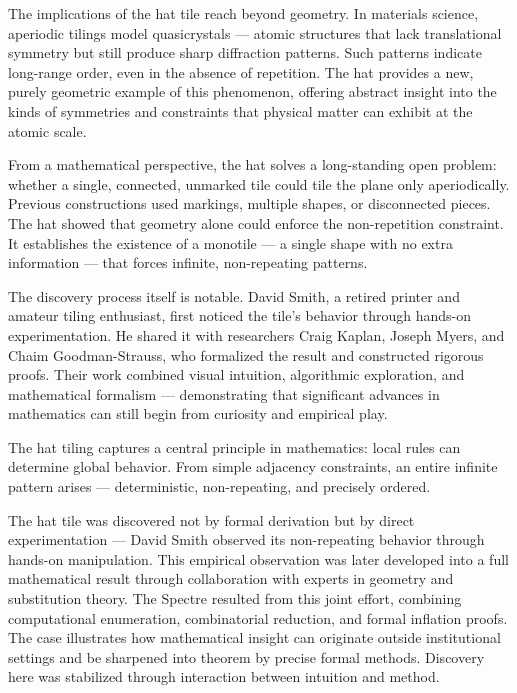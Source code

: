 The implications of the hat tile reach beyond geometry. In materials science, aperiodic tilings model quasicrystals — atomic structures that lack translational symmetry but still produce sharp diffraction patterns. Such patterns indicate long-range order, even in the absence of repetition. The hat provides a new, purely geometric example of this phenomenon, offering abstract insight into the kinds of symmetries and constraints that physical matter can exhibit at the atomic scale.

From a mathematical perspective, the hat solves a long-standing open problem: whether a single, connected, unmarked tile could tile the plane only aperiodically. Previous constructions used markings, multiple shapes, or disconnected pieces. The hat showed that geometry alone could enforce the non-repetition constraint. It establishes the existence of a monotile — a single shape with no extra information — that forces infinite, non-repeating patterns.

The discovery process itself is notable. David Smith, a retired printer and amateur tiling enthusiast, first noticed the tile’s behavior through hands-on experimentation. He shared it with researchers Craig Kaplan, Joseph Myers, and Chaim Goodman-Strauss, who formalized the result and constructed rigorous proofs. Their work combined visual intuition, algorithmic exploration, and mathematical formalism — demonstrating that significant advances in mathematics can still begin from curiosity and empirical play.

The hat tiling captures a central principle in mathematics: local rules can determine global behavior. From simple adjacency constraints, an entire infinite pattern arises — deterministic, non-repeating, and precisely ordered.
\clearpage

\begin{commentary}
The hat tile was discovered not by formal derivation but by direct experimentation — David Smith observed its non-repeating behavior through hands-on manipulation. This empirical observation was later developed into a full mathematical result through collaboration with experts in geometry and substitution theory. The Spectre resulted from this joint effort, combining computational enumeration, combinatorial reduction, and formal inflation proofs. The case illustrates how mathematical insight can originate outside institutional settings and be sharpened into theorem by precise formal methods. Discovery here was stabilized through interaction between intuition and method.
\end{commentary}

